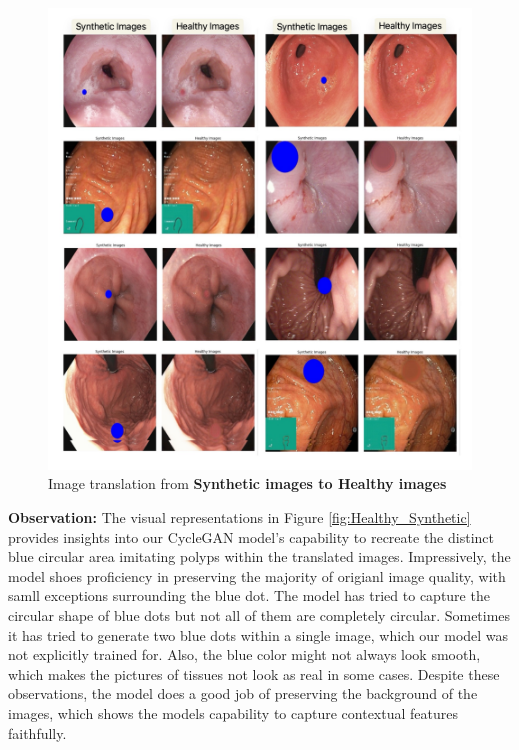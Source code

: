 \documentclass[UKenglish,12pt]{master-style}
\begin{document}
\begin{figure}[htbp]
    \centering
    \includegraphics[width=1\textwidth]{Images/Synthetic_Healthy.jpeg}
    \caption{Image translation from \textbf{Synthetic images to Healthy images}}
    \label{fig:Synthetic_Healthy}
\end{figure}

\textbf{Observation: } The visual representations in Figure \ref{fig:Healthy_Synthetic} provides insights into our CycleGAN model's capability to recreate the distinct blue circular area imitating polyps within the translated images. Impressively, the model shoes proficiency in preserving the majority of origianl image quality, with samll exceptions surrounding the blue dot. The model has tried to capture the circular shape of blue dots but not all of them are completely circular. Sometimes it has tried to generate two blue dots within a single image, which our model was not explicitly trained for. Also, the blue color might not always look smooth, which makes the pictures of tissues not look as real in some cases. Despite these observations, the model does a good job of preserving the background of the images, which shows the models capability to 
capture contextual features faithfully.
\end{document}
